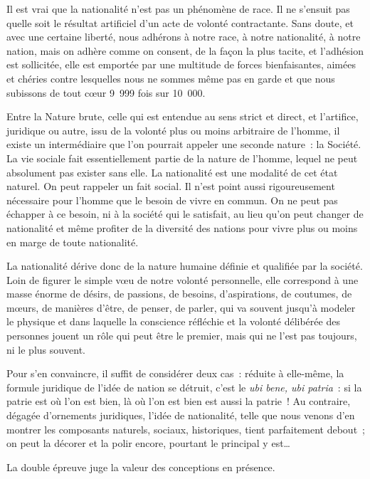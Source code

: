 \documentclass[french,twoside]{book} %
\newcommand{\astermono}{\medskip\centerline{\color{rubric}\large\selectfont{\syms ✻}}\medskip\par}%
\begin{document}
\astermono

\noindent Il est vrai que la nationalité n’est pas un phénomène de race. Il ne s’ensuit pas quelle soit le résultat artificiel d’un acte de volonté contractante. Sans doute, et avec une certaine liberté, nous adhérons à notre race, à notre nationalité, à notre nation, mais on adhère comme on consent, de la façon la plus tacite, et l’adhésion est sollicitée, elle est emportée par une multitude de forces bienfaisantes, aimées et chéries contre lesquelles nous ne sommes même pas en garde et que nous subissons de tout cœur 9 999 fois sur 10 000.\par
Entre la Nature brute, celle qui est entendue au sens strict et direct, et l’artifice, juridique ou autre, issu de la volonté plus ou moins arbitraire de l’homme, il existe un intermédiaire que l’on pourrait appeler une seconde nature : la Société. La vie sociale fait essentiellement partie de la nature de l’homme, lequel ne peut absolument pas exister sans elle. La nationalité est une modalité de cet état naturel. On peut rappeler un fait social. Il n’est point aussi rigoureusement nécessaire pour l’homme que le besoin de vivre en commun. On ne peut pas échapper à ce besoin, ni à la société qui le satisfait, au lieu qu’on peut changer de nationalité et même profiter de la diversité des nations pour vivre plus ou moins en marge de toute nationalité.\par
La nationalité dérive donc de la nature humaine définie et qualifiée par la société. Loin de figurer le simple vœu de notre volonté personnelle, elle correspond à une masse énorme de désirs, de passions, de besoins, d’aspirations, de coutumes, de mœurs, de manières d’être, de penser, de parler, qui va souvent jusqu’à modeler le physique et dans laquelle la conscience réfléchie et la volonté délibérée des personnes jouent un rôle qui peut être le premier, mais qui ne l’est pas toujours, ni le plus souvent.\par
Pour s’en convaincre, il suffit de considérer deux cas : réduite à elle-même, la formule juridique de l’idée de nation se détruit, c’est le \emph{ubi bene, ubi patria} : si la patrie est où l’on est bien, là où l’on est bien est aussi la patrie ! Au contraire, dégagée d’ornements juridiques, l’idée de nationalité, telle que nous venons d’en montrer les composants naturels, sociaux, historiques, tient parfaitement debout ; on peut la décorer et la polir encore, pourtant le principal y est…\par
La double épreuve juge la valeur des conceptions en présence.
\end{document}
